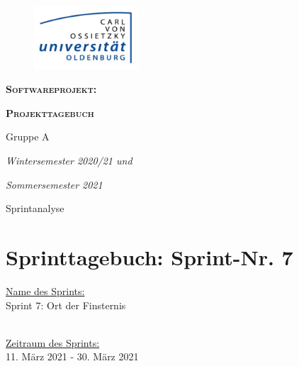 \documentclass[12pt,a4paper, oneside]{article}
\author{Uni Oldenburg, SWP2020 Gruppe A}
\begin{document}
    \begin{titlepage}
        \pagestyle{empty}
        \begin{center}

            \begin{figure}[h]
                \centering
                \includegraphics[width=0.35\textwidth]{../img/Logo.jpg}
            \end{figure}

            \bigskip \bigskip \noindent
            \textsc{\textbf{\LARGE Softwareprojekt:}} \par \bigskip \noindent
            \textsc{\textbf{\LARGE Projekttagebuch}}


            \par \bigskip \bigskip \bigskip \bigskip \bigskip \noindent
            {\Large Gruppe A} \par \medskip \noindent

            \par \bigskip \bigskip \bigskip \bigskip \bigskip \bigskip \noindent
            \textit{\Large Wintersemester 2020/21 und} \par \noindent
            \textit{\Large Sommersemester 2021}

            \par \bigskip \bigskip \bigskip \bigskip \bigskip \bigskip \noindent
            \par \bigskip \bigskip \bigskip \noindent
            {\Large Sprintanalyse} \par \medskip \noindent

        \end{center}
    \end{titlepage}

    \tableofcontents
    \pagebreak


    \section{Sprinttagebuch: Sprint-Nr. 7}
    \underline{Name des Sprints:}
    \\
    Sprint 7: Ort der Finsternis

    \noindent
    \\
    \underline{Zeitraum des Sprints:}
    \\
    11. März 2021 - 30. März 2021
\end{document}
